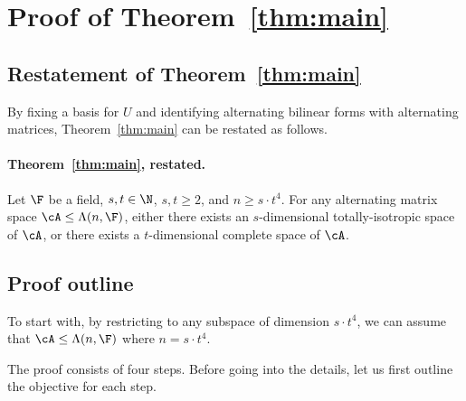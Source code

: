 \section{Proof of Theorem~\ref{thm:main}}\label{sec:thm_proof}

%
%

\subsection{Restatement of Theorem~\ref{thm:main}} By fixing a basis for $U$ and 
identifying alternating bilinear forms with alternating matrices, 
Theorem~\ref{thm:main} can be restated as follows. 

\paragraph{Theorem~\ref{thm:main}, restated.} Let $\F$ be a field, $s, t\in \N$, 
$s, t\geq 2$, and $n\geq s\cdot t^4$. For any alternating matrix space
$\cA\leq\Lambda(n, \F)$, either there exists an $s$-dimensional totally-isotropic 
space of $\cA$, or there exists a $t$-dimensional complete space of $\cA$.


%
%
%
%


\subsection{Proof outline} 
To start with, by restricting to any subspace of dimension $s\cdot t^4$, we can 
assume that $\cA\leq\Lambda(n, \F)$ where $n=s\cdot t^4$. 

The proof consists of four steps. Before going into the 
details, let us first outline the objective for each step. 

%
%

